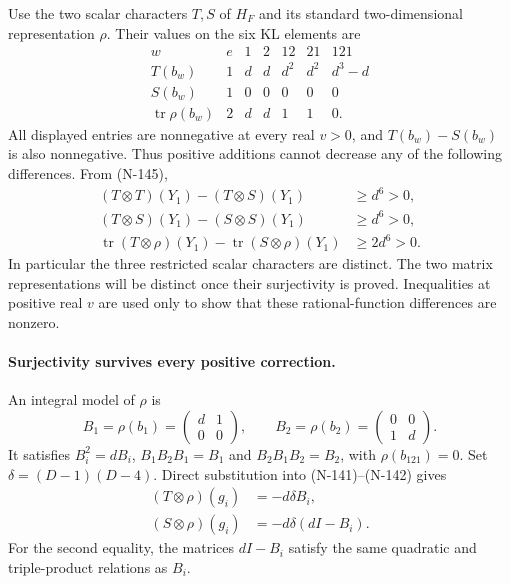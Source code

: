 Use the two scalar characters $T,S$ of $H_F$ and its standard
two-dimensional representation $\rho$.  Their values on the six
KL elements are
\[
\begin{array}{c|rrrrrr}
 w&e&1&2&12&21&121\\\hline
 T(b_w)&1&d&d&d^2&d^2&d^3-d\\
 S(b_w)&1&0&0&0&0&0\\
 \operatorname{tr}\rho(b_w)&2&d&d&1&1&0.
\end{array}\tag{N-146}
\]
All displayed entries are nonnegative at every real $v>0$, and
$T(b_w)-S(b_w)$ is also nonnegative.  Thus positive additions cannot
decrease any of the following differences.  From (N-145),
\[
\begin{aligned}
 (T\otimes T)(Y_1)-(T\otimes S)(Y_1)&\ge d^6>0,\\
 (T\otimes S)(Y_1)-(S\otimes S)(Y_1)&\ge d^6>0,\\
 \operatorname{tr}(T\otimes\rho)(Y_1)
   -\operatorname{tr}(S\otimes\rho)(Y_1)&\ge2d^6>0.
\end{aligned}\tag{N-147}
\]
In particular the three restricted scalar characters are distinct.
The two matrix representations will be distinct once their
surjectivity is proved.  Inequalities at positive real $v$ are used
only to show that these rational-function differences are nonzero.

\paragraph{Surjectivity survives every positive correction.}
An integral model of $\rho$ is
\[
 B_1=\rho(b_1)=\begin{pmatrix}d&1\\0&0\end{pmatrix},\qquad
 B_2=\rho(b_2)=\begin{pmatrix}0&0\\1&d\end{pmatrix}.
 \tag{N-148}
\]
It satisfies $B_i^2=dB_i$, $B_1B_2B_1=B_1$ and
$B_2B_1B_2=B_2$, with $\rho(b_{121})=0$.
Set $\delta=(D-1)(D-4)$.  Direct substitution into (N-141)--(N-142)
gives
\[
 \begin{aligned}
 (T\otimes\rho)(g_i)&=-d\delta B_i,\\
 (S\otimes\rho)(g_i)&=-d\delta(dI-B_i).
 \end{aligned}\tag{N-149}
\]
For the second equality, the matrices $dI-B_i$ satisfy the same
quadratic and triple-product relations as $B_i$.

